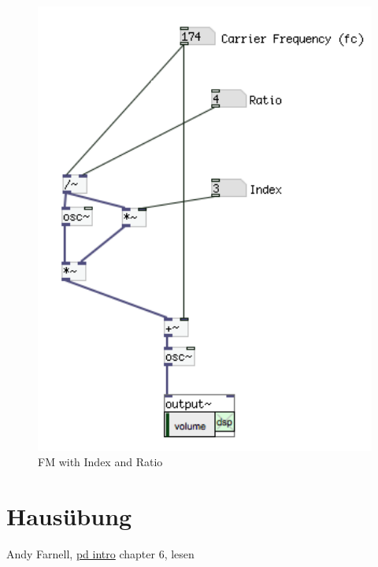 \begin{figure}[H]
	\begin{center}
		\includegraphics[width = 14cm]{img/FMcorrect.png}
		\caption{FM with Index and Ratio}
		\label{fig:fmComplete}
	\end{center}
\end{figure}

\section{Hausübung}
\label{sub:Hausuebung}
Andy Farnell, \href{http://aspress.co.uk/ds/pdf/pd_intro.pdf}{pd intro} chapter 6, lesen

